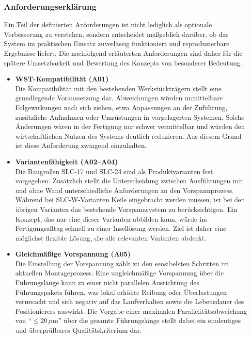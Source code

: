 \subsubsection{Anforderungserklärung}
Ein Teil der definierten Anforderungen ist nicht lediglich als optionale Verbesserung zu verstehen, sondern entscheidet maßgeblich darüber, ob das System im praktischen Einsatz zuverlässig funktioniert und reproduzierbare Ergebnisse liefert. Die nachfolgend erläuterten Anforderungen sind daher für die spätere Umsetzbarkeit und Bewertung des Konzepts von besonderer Bedeutung.

\begin{itemize}
    \item \textbf{WST-Kompatibilität (A01)} \\
    Die Kompatibilität mit den bestehenden Werkstückträgern stellt eine grundlegende Voraussetzung dar. Abweichungen würden unmittelbare Folgewirkungen nach sich ziehen, etwa Anpassungen an der Zuführung, zusätzliche Aufnahmen oder Umrüstungen in vorgelagerten Systemen. Solche Änderungen wären in der Fertigung nur schwer vermittelbar und würden den wirtschaftlichen Nutzen des Systems deutlich reduzieren. Aus diesem Grund ist diese Anforderung zwingend einzuhalten.

    \item \textbf{Variantenfähigkeit (A02–A04)} \\
    Die Baugrößen SLC-17 und SLC-24 sind als Produktvarianten fest vorgegeben. Zusätzlich stellt die Unterscheidung zwischen Ausführungen mit und ohne Wand unterschiedliche Anforderungen an den Vorspannprozess. Während bei SLC-W-Varianten Keile eingebracht werden müssen, ist bei den übrigen Varianten das bestehende Vorspannsystem zu berücksichtigen. Ein Konzept, das nur eine dieser Varianten abbilden kann, würde im Fertigungsalltag schnell zu einer Insellösung werden. Ziel ist daher eine möglichst flexible Lösung, die alle relevanten Varianten abdeckt.

    \item \textbf{Gleichmäßige Vorspannung (A05)} \\
    Die Einstellung der Vorspannung zählt zu den sensibelsten Schritten im aktuellen Montageprozess. Eine ungleichmäßige Vorspannung über die Führungslänge kann zu einer nicht parallelen Ausrichtung des Führungspakets führen, was lokal erhöhte Reibung oder Überlastungen verursacht und sich negativ auf das Laufverhalten sowie die Lebensdauer des Positionierers auswirkt.  
    Die Vorgabe einer maximalen Parallelitätsabweichung von \enquote{$\leq 20\,\mu\mathrm{m}$} über die gesamte Führungslänge stellt dabei ein eindeutiges und überprüfbares Qualitätskriterium dar.


\end{itemize}
